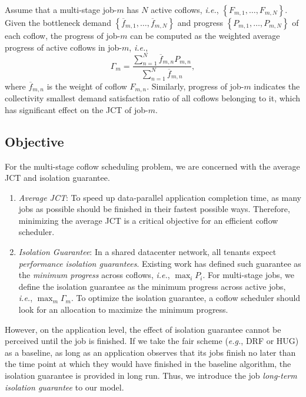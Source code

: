 \documentclass[10pt, conference, letterpaper]{IEEEtran}
\begin{document}
Assume that a multi-stage job-$m$ has $N$ active coflows, \emph{i.e.}, $\left\{F_{m,1},\dots,F_{m,N}\right\}$. Given the bottleneck demand $\left\{\overline{f}_{m,1},\dots,\overline{f}_{m,N}\right\}$ and progress $\left\{P_{m,1},\dots,P_{m,N}\right\}$ of each coflow, the progress of job-$m$ can be computed as the weighted average progress of active coflows in job-$m$, \emph{i.e.},
\begin{equation}
	\Gamma_m = \frac{\sum_{n=1}^N \overline{f}_{m,n}P_{m,n}}{\sum_{n=1}^N \overline{f}_{m,n}},
\end{equation}
where $\overline{f}_{m,n}$ is the weight of coflow $F_{m,n}$. Similarly, progress of job-$m$ indicates the collectivity smallest demand satisfaction ratio of all coflows belonging to it, which has significant effect on the JCT of job-$m$.

\subsection{Objective}
For the multi-stage coflow  scheduling problem, we are concerned with the average JCT and isolation guarantee.

\begin{enumerate}
	\item \emph{Average JCT}: To speed up data-parallel application completion time, as many jobs as possible should be finished in their fastest possible ways. Therefore, minimizing the average JCT is a critical objective for an efficient coflow scheduler.
	\item \emph{Isolation Guarantee}: In a shared datacenter network, all tenants expect \emph{performance isolation guarantees}. Existing work has defined such guarantee as the \emph{minimum progress} across coflows\cite{HUG}, \emph{i.e.}, $\max_i P_i$. For multi-stage jobs, we define the isolation guarantee as the minimum progress across active jobs, \emph{i.e.}, $\max_m \Gamma_m$. To optimize the isolation guarantee, a coflow scheduler should look for an allocation to maximize the minimum progress.
\end{enumerate}

However, on the application level, the effect of isolation guarantee cannot be perceived until the job is finished. If we take the fair scheme (\emph{e.g.}, DRF\cite{DRF} or HUG\cite{HUG}) as a baseline, as long as an application observes that its jobs finish no later than the time point at which they would have finished in the baseline algorithm, the isolation guarantee is provided in long run. Thus, we introduce the job \emph{long-term isolation guarantee} to our model.
\end{document}
